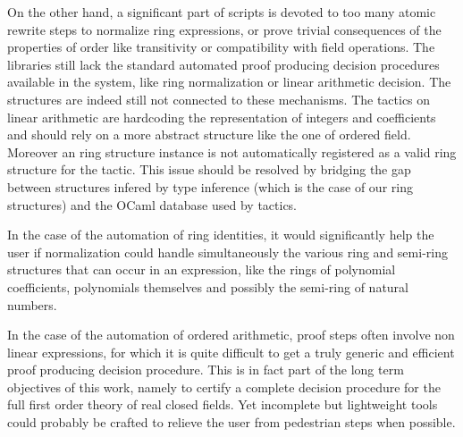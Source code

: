 \documentclass{mscs}
\begin{document}
On the other hand, a significant part of scripts is devoted to too
many atomic rewrite steps to normalize ring expressions, or prove trivial
consequences of the properties of order like transitivity or
compatibility with field operations. The \ssr{} libraries still
lack the standard
automated proof producing decision procedures available in the \Coq{}
system, like ring normalization or linear arithmetic decision. The
\ssr{} structures are indeed still not connected to these
mechanisms. The \Coq{} tactics on linear arithmetic are hardcoding the
representation of integers and coefficients and should rely on a more
abstract structure like the one of ordered field. Moreover an \ssr{}
ring structure instance is not automatically registered as a
valid ring structure for the  tactic. This issue should be
resolved by bridging the gap between structures infered by type inference
(which is the case of our ring structures) and the OCaml database used
by \Coq{} tactics.

In the case of the automation of ring identities, it would significantly
help the user if normalization could handle simultaneously the various
ring and semi-ring structures that can occur in an expression, like
the rings of polynomial coefficients, polynomials themselves and
possibly the semi-ring of natural numbers.

In the case of the automation of ordered arithmetic, proof steps
often involve non linear expressions, for which it is quite difficult
to get a truly generic and efficient proof producing decision
procedure. This is in fact part of the long term objectives of this
work, namely to
certify a complete decision procedure for the full first order theory
of real closed fields. Yet incomplete but lightweight tools could
probably be crafted to relieve the user from pedestrian steps when
possible.
\end{document}
